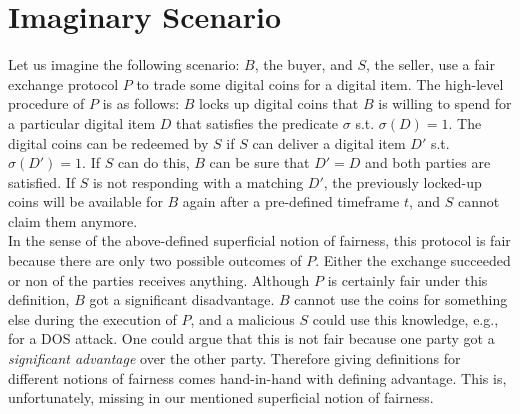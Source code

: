 \documentclass{cacthesis}
\newcounter{protocol}
\begin{document}
        \section{Imaginary Scenario}
        Let us imagine the following scenario: $B$, the buyer, and $S$, the seller, use a fair exchange protocol $P$ to trade some digital coins for a digital item. The high-level procedure of $P$ is as follows: $B$ locks up digital coins that $B$ is willing to spend for a particular digital item $D$ that satisfies the predicate $\sigma$ s.t. $\sigma\left( D\right) =1$. The digital coins can be redeemed by $S$ if $S$ can deliver a digital item $D'$ s.t. $\sigma\left( D'\right) =1$. If $S$ can do this, $B$ can be sure that $D' = D$ and both parties are satisfied. If $S$ is not responding with a matching $D'$, the previously locked-up coins will be available for $B$ again after a pre-defined timeframe $t$, and $S$ cannot claim them anymore. \\
        In the sense of the above-defined superficial notion of fairness, this protocol is fair because there are only two possible outcomes of $P$. Either the exchange succeeded or non of the parties receives anything. 
        Although $P$ is certainly fair under this definition, $B$ got a significant disadvantage. $B$ cannot use the coins for something else during the execution of $P$, and a malicious $S$ could use this knowledge, e.g., for a DOS attack. One could argue that this is not fair because one party got a \textit{significant advantage} over the other party. Therefore giving definitions for different notions of fairness comes hand-in-hand with defining advantage. This is, unfortunately, missing in our mentioned superficial notion of fairness. 
        
\end{document}
